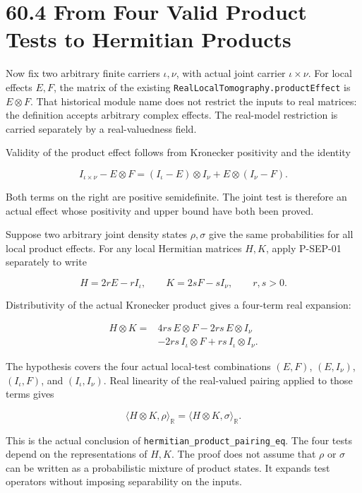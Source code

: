 \documentclass[
  11pt,
  oneside]{book}
\begin{document}
\section{60.4 From Four Valid Product Tests to Hermitian Products}

Now fix two arbitrary finite carriers \(\iota,\nu\), with actual joint
carrier \(\iota\times\nu\). For local effects \(E,F\), the matrix of the
existing \texttt{Real\allowbreak Local\allowbreak Tomography.\allowbreak product\allowbreak Effect} is \(E\otimes F\).
That historical module name does not restrict the inputs to real
matrices: the definition accepts arbitrary complex effects. The
real-model restriction is carried separately by a real-valuedness field.

Validity of the product effect follows from Kronecker positivity and the
identity

\[
I_{\iota\times\nu}-E\otimes F
=(I_\iota-E)\otimes I_\nu
+E\otimes(I_\nu-F).
\]

Both terms on the right are positive semidefinite. The joint test is
therefore an actual effect whose positivity and upper bound have both
been proved.

Suppose two arbitrary joint density states \(\rho,\sigma\) give the same
probabilities for all local product effects. For any local Hermitian
matrices \(H,K\), apply P-SEP-01 separately to write

\[
H=2rE-rI_\iota,\qquad K=2sF-sI_\nu,
\qquad r,s>0.
\]

Distributivity of the actual Kronecker product gives a four-term real
expansion:

\[
\begin{aligned}
H\otimes K={}&4rs\,E\otimes F
-2rs\,E\otimes I_\nu\\
&-2rs\,I_\iota\otimes F
+rs\,I_\iota\otimes I_\nu.
\end{aligned}
\]

The hypothesis covers the four actual local-test combinations \((E,F)\),
\((E,I_\nu)\), \((I_\iota,F)\), and \((I_\iota,I_\nu)\). Real linearity
of the real-valued pairing applied to those terms gives

\[
\langle H\otimes K,\rho\rangle_{\mathbb R}
=\langle H\otimes K,\sigma\rangle_{\mathbb R}.
\]

This is the actual conclusion of
\texttt{hermitian\_\allowbreak product\_\allowbreak pairing\_\allowbreak eq}. The four tests depend on the
representations of \(H,K\). The proof does not assume that \(\rho\) or
\(\sigma\) can be written as a probabilistic mixture of product states.
It expands test operators without imposing separability on the inputs.
\end{document}

